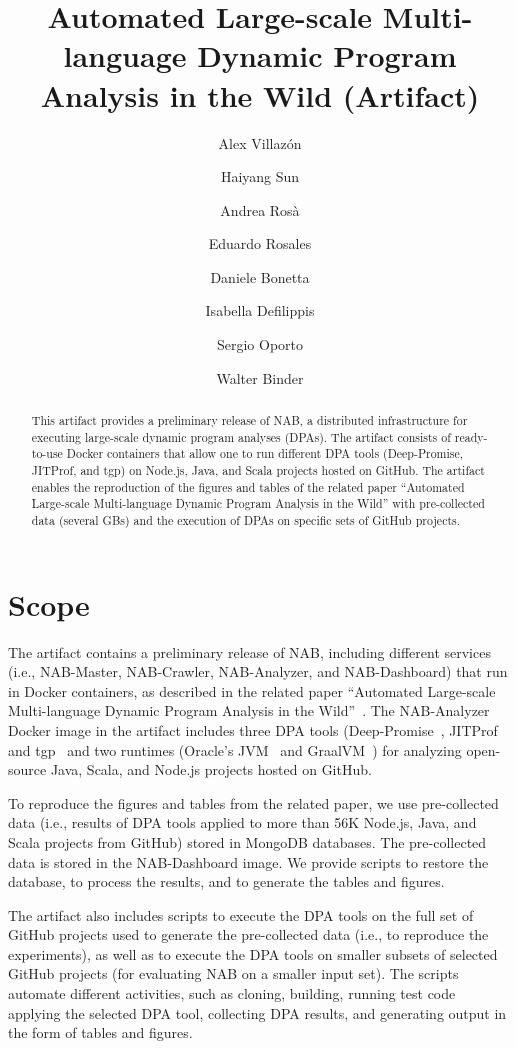 \documentclass[a4paper,english]{darts-v2019}
\title{Automated Large-scale Multi-language Dynamic Program Analysis in the Wild (Artifact)} %
\author{Alex Villaz\'on}{Universidad Privada Boliviana, Bolivia}{avillazon@upb.edu}{https://orcid.org/0000-0001-8428-3420}{}%
\author{Haiyang Sun}{Universit\`a della Svizzera italiana, Switzerland}{haiyang.sun@usi.ch}{}{}
\author{Andrea Ros\`a}{Universit\`a della Svizzera italiana, Switzerland}{andrea.rosa@usi.ch}{}{}
\author{Eduardo Rosales}{Universit\`a della Svizzera italiana, Switzerland}{rosale@usi.ch}{https://orcid.org/0000-0002-6404-3128}{}
\author{Daniele Bonetta}{Oracle Labs, United States}{daniele.bonetta@oracle.com}{}{}
\author{Isabella Defilippis}{Universidad Privada Boliviana, Bolivia}{isabelladefilippis@upb.edu}{}{}
\author{Sergio Oporto}{Universidad Privada Boliviana, Bolivia}{sergiooporto@upb.edu}{}{}
\author{Walter Binder}{Universit\`a della Svizzera italiana, Switzerland}{walter.binder@usi.ch}{}{}
\newenvironment{scope}{\section{Scope}}{}
\begin{document}
\maketitle

\begin{abstract}
This artifact provides a preliminary release of NAB, a distributed infrastructure for executing large-scale dynamic program analyses (DPAs). The artifact consists of ready-to-use Docker containers that allow one to run different DPA tools (Deep-Promise, JITProf, and tgp) on Node.js, Java, and Scala projects hosted on GitHub. The artifact enables the reproduction of the figures and tables of the related paper ``Automated Large-scale Multi-language Dynamic Program Analysis in the Wild'' with pre-collected data (several GBs) and the execution of DPAs on specific sets of GitHub projects.
 \end{abstract}


\begin{scope}

The artifact contains a preliminary release of NAB, including different services (i.e., NAB-Master, NAB-Crawler, NAB-Analyzer, and NAB-Dashboard) that run in Docker containers, as described in the related paper  ``Automated Large-scale Multi-language Dynamic Program Analysis in the Wild''~\cite{Villazon:2019:NAB}. The NAB-Analyzer Docker image in the artifact includes three DPA tools (Deep-Promise~\cite{Villazon:2019:NAB}, JITProf \cite{Gong:2015:JITProf} and tgp~\cite{tgp2017,Rosa:2018:tgp,TOPLAS19}
and two runtimes (Oracle's JVM~\cite{HotSpotJVM} and GraalVM~\cite{graaljs2017}) for analyzing open-source Java, Scala, and Node.js projects hosted on GitHub.

To reproduce the figures and tables from the related paper, we use pre-collected data (i.e., results of DPA tools applied to more than 56K  Node.js, Java, and Scala projects from GitHub) stored in MongoDB databases. The pre-collected data is stored in the NAB-Dashboard image. We provide scripts to restore the database, to process the results, and to generate the tables and figures.

The artifact also includes scripts to execute the DPA tools on the full set of GitHub projects used to generate the pre-collected data (i.e., to reproduce the experiments), as well as to execute the DPA tools on smaller subsets of selected GitHub projects (for evaluating NAB on a smaller input set).  The scripts automate different activities, such as cloning, building, running test code applying the selected DPA tool, collecting DPA results, and generating output in the form of tables and figures.

\end{scope}
\end{document}

